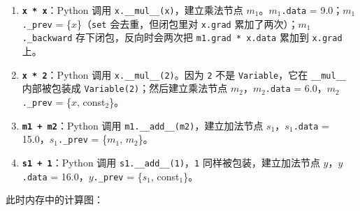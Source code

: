 \begin{enumerate}
    \item \textbf{\texttt{x * x}}：Python 调用 \texttt{x.\_\_mul\_\_(x)}，建立乘法节点 $m_1$。$m_1$\texttt{.data} = 9.0；$m_1$\texttt{.\_prev} = \{$x$\}（\texttt{set} 会去重，但闭包里对 \texttt{x.grad} 累加了两次）；$m_1$\texttt{.\_backward} 存下闭包，反向时会两次把 \texttt{m1.grad * x.data} 累加到 \texttt{x.grad} 上。

    \item \textbf{\texttt{x * 2}}：Python 调用 \texttt{x.\_\_mul\_\_(2)}。因为 \texttt{2} 不是 \texttt{Variable}，它在 \texttt{\_\_mul\_\_} 内部被包装成 \texttt{Variable(2)}；然后建立乘法节点 $m_2$，$m_2$\texttt{.data} = 6.0，$m_2$\texttt{.\_prev} = \{$x$, const$_2$\}。

    \item \textbf{\texttt{m1 + m2}}：Python 调用 \texttt{m1.\_\_add\_\_(m2)}，建立加法节点 $s_1$，$s_1$\texttt{.data} = 15.0，$s_1$\texttt{.\_prev} = \{$m_1$, $m_2$\}。

    \item \textbf{\texttt{s1 + 1}}：Python 调用 \texttt{s1.\_\_add\_\_(1)}，\texttt{1} 同样被包装，建立加法节点 $y$，$y$\texttt{.data} = 16.0，$y$\texttt{.\_prev} = \{$s_1$, const$_1$\}。
\end{enumerate}

此时内存中的计算图：

